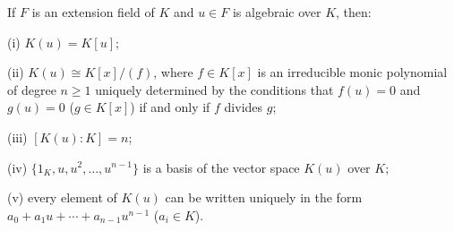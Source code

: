If $F$ is an extension field of $K$ and $u \in F$ is algebraic over $K$, then:

(i) $K(u) = K[u]$;

(ii) $K(u) \cong K[x]/(f)$, where $f \in K[x]$ is an irreducible monic polynomial of degree $n \geq 1$ uniquely determined by the conditions that $f(u) = 0$ and $g(u) = 0$ ($g \in K[x]$) if and only if $f$ divides $g$;

(iii) $[K(u):K] = n$;

(iv) $\{1_K, u, u^2, \ldots, u^{n-1}\}$ is a basis of the vector space $K(u)$ over $K$;

(v) every element of $K(u)$ can be written uniquely in the form $a_0 + a_1u + \cdots + a_{n-1}u^{n-1}$ ($a_i \in K$).
